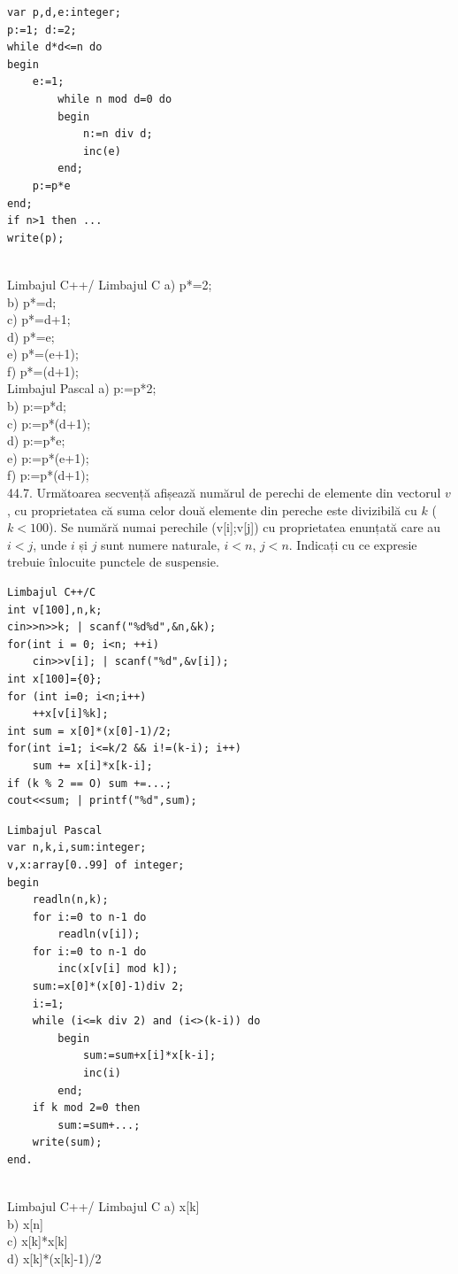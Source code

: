 \begin{itemize}
\begin{enumerate}
\begin{verbatim}
var p,d,e:integer;
p:=1; d:=2;
while d*d<=n do
begin
    e:=1;
        while n mod d=0 do
        begin
            n:=n div d;
            inc(e)
        end;
    p:=p*e
end;
if n>1 then ...
write(p);
\end{verbatim}
\\
Limbajul C++/ Limbajul C
a) p*=2;
\\
b) p*=d;
\\
c) p*=d+1;
\\
d) p*=e;
\\
e) p*=(e+1);
\\
f) p*=(d+1);
\\
Limbajul Pascal
a) p:=p*2;
\\
b) p:=p*d;
\\
c) p:=p*(d+1);
\\
d) p:=p*e;
\\
e) p:=p*(e+1);
\\
f) p:=p*(d+1);
\\
44.7. Următoarea secvență afișează numărul de perechi de elemente din vectorul $v$, cu proprietatea că suma celor două elemente din pereche este divizibilă cu $k$ ($k<100$). Se numără numai perechile (v[i];v[j]) cu proprietatea enunțată care au $i<j$, unde $i$ și $j$ sunt numere naturale, $i<n$, $j<n$. Indicați cu ce expresie trebuie înlocuite punctele de suspensie.
\begin{verbatim}
Limbajul C++/C
int v[100],n,k;
cin>>n>>k; | scanf("%d%d",&n,&k);
for(int i = 0; i<n; ++i)
    cin>>v[i]; | scanf("%d",&v[i]);
int x[100]={0};
for (int i=0; i<n;i++)
    ++x[v[i]%k];
int sum = x[0]*(x[0]-1)/2;
for(int i=1; i<=k/2 && i!=(k-i); i++)
    sum += x[i]*x[k-i];
if (k % 2 == O) sum +=...;
cout<<sum; | printf("%d",sum);
\end{verbatim}
\begin{verbatim}
Limbajul Pascal
var n,k,i,sum:integer;
v,x:array[0..99] of integer;
begin
    readln(n,k);
    for i:=0 to n-1 do
        readln(v[i]);
    for i:=0 to n-1 do
        inc(x[v[i] mod k]);
    sum:=x[0]*(x[0]-1)div 2;
    i:=1;
    while (i<=k div 2) and (i<>(k-i)) do
        begin
            sum:=sum+x[i]*x[k-i];
            inc(i)
        end;
    if k mod 2=0 then
        sum:=sum+...;
    write(sum);
end.
\end{verbatim}
\\
Limbajul C++/ Limbajul C
a) x[k]
\\
b) x[n]
\\
c) x[k]*x[k]
\\
d) x[k]*(x[k]-1)/2
\\

\end{enumerate}
\end{itemize}
